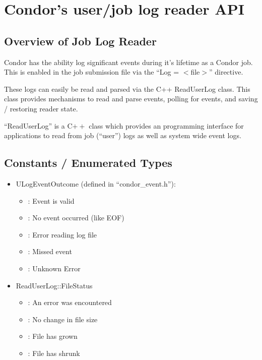 \section{\label{sec:job-log-reader}
Condor's user/job log reader API}
\label{sec:readuserlogref}


\subsection{\label{sec:job-log-reader-overview}
Overview of Job Log Reader}
Condor has the ability log significant events during it's lifetime as
a Condor job.  This is enabled in the job submission file via the
``Log = $<$file$>$'' directive.

These logs can easily be read and parsed via the C++ ReadUserLog
class.  This class provides mechanisms to read and parse events,
polling for events, and saving / restoring reader state.

``ReadUserLog'' is a C$++$ class which provides an programming
interface for applications to read from job (``user'') logs as well as
system wide event logs.

\subsection{Constants / Enumerated Types}
\begin{itemize}

\item ULogEventOutcome (defined in ``condor\_event.h''):
  \begin{itemize}
    \item {}: Event is valid
    \item {}: No event occurred (like EOF)
    \item {}: Error reading log file
    \item {}: Missed event
    \item {}: Unknown Error
  \end{itemize}

\item ReadUserLog::FileStatus
  \begin{itemize}
    \item {}: An error was encountered
    \item {}: No change in file size
    \item {}: File has grown
    \item {}: File has shrunk
  \end{itemize}

\end{itemize}


